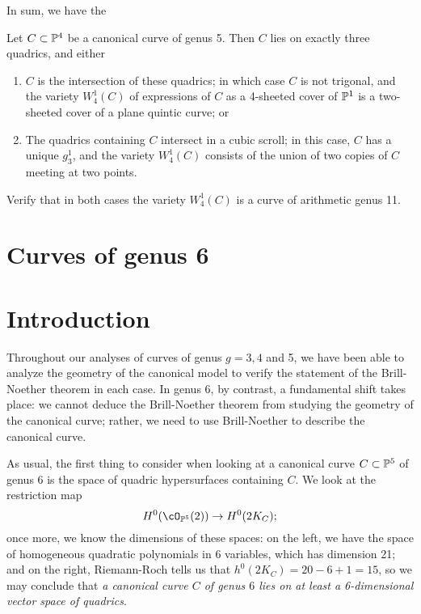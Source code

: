 In sum, we have the

\begin{theorem}
Let $C \subset \PP^4$ be a canonical curve of genus 5. Then $C$ lies on exactly three quadrics, and either
\begin{enumerate}
\item $C$ is the intersection of these quadrics; in which case $C$ is not trigonal, and the variety $W^1_4(C)$ of expressions of $C$ as a 4-sheeted cover of $\PP^1$ is a two-sheeted cover of a plane quintic curve; or
\item The quadrics containing $C$ intersect in a cubic scroll; in this case, $C$ has a unique $g^1_3$, and the variety $W^1_4(C)$ consists of the union of two copies of $C$ meeting at two points.
\end{enumerate}
\end{theorem}

\begin{exercise}
Verify that in both cases the variety $W^1_4(C)$ is a curve of arithmetic genus 11.
\end{exercise}

\section{Curves of genus 6}

\section{Introduction}

Throughout our analyses of curves of genus $g = 3, 4$ and 5, we have been able to analyze the geometry of the canonical model to verify the statement of the Brill-Noether theorem in each case. In genus 6, by contrast, a fundamental shift takes place: we cannot deduce the Brill-Noether theorem from studying the geometry of the canonical curve; rather, we need to use Brill-Noether to describe the canonical curve.

As usual, the first thing to consider when looking at a canonical curve $C \subset \PP^5$ of genus 6 is the space of quadric hypersurfaces containing $C$. We look at the restriction map
$$
H^0(\cO_{\PP^5}(2)) \to H^0(2K_C);
$$
once more, we know the dimensions of these spaces: on the left, we have the space of homogeneous quadratic polynomials in 6 variables, which has dimension 21; and on the right, Riemann-Roch tells us that $h^0(2K_C) = 20 - 6 + 1 = 15$, so we may conclude that \emph{a canonical curve $C$ of genus $6$ lies on at least a 6-dimensional vector space of quadrics}.

